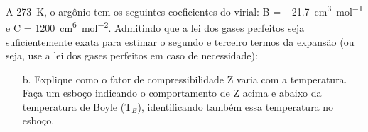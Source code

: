 \begin{xcs}
    A \qty{273}{K}, o argônio tem os seguintes coeficientes do virial: 
    B = \qty{-21,7}{cm^3 mol^{-1}} e C = \qty{1200}{cm^6 mol^{-2}}.
    Admitindo que a lei dos gases perfeitos seja
    suficientemente exata para estimar o segundo e terceiro termos da expansão
    (ou seja, use a lei dos gases perfeitos em caso de necessidade): 
    \begin{enumerate}[label=\alph*.]
        \item[b.] Explique como o fator de compressibilidade Z varia com a
            temperatura. Faça um esboço indicando o comportamento de Z acima e
            abaixo da temperatura de Boyle (T\(_B\)), identificando também essa
            temperatura no esboço. 
    \end{enumerate}
\end{xcs}
\begin{rsl}
    
\end{rsl}
